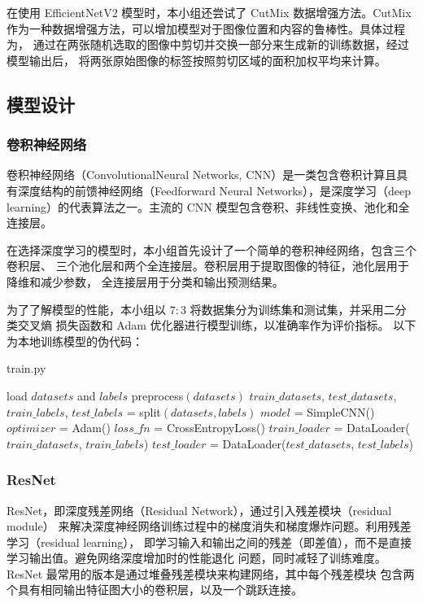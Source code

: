 \documentclass[UTF8,12pt,a4paper]{ctexart}
\begin{document}
在使用 EfficientNetV2 模型时，本小组还尝试了 CutMix 数据增强方法。CutMix 
作为一种数据增强方法，可以增加模型对于图像位置和内容的鲁棒性。具体过程为，
通过在两张随机选取的图像中剪切并交换一部分来生成新的训练数据，经过模型输出后，
将两张原始图像的标签按照剪切区域的面积加权平均来计算。
\subsection{模型设计}
\subsubsection{卷积神经网络}
卷积神经网络（ConvolutionalNeural Networks, CNN）是一类包含卷积计算且具
有深度结构的前馈神经网络（Feedforward Neural Networks），是深度学习（deep
 learning）的代表算法之一。主流的 CNN 模型包含卷积、非线性变换、池化和全连接层。

在选择深度学习的模型时，本小组首先设计了一个简单的卷积神经网络，包含三个卷积层、
三个池化层和两个全连接层。卷积层用于提取图像的特征，池化层用于降维和减少参数，
全连接层用于分类和输出预测结果。

为了了解模型的性能，本小组以 $7: 3$ 将数据集分为训练集和测试集，并采用二分类交叉熵
损失函数和 Adam 优化器进行模型训练，以准确率作为评价指标。
以下为本地训练模型的伪代码：

\begin{algorithm}[H]
	\caption{train.py}
	\BlankLine

	load $datasets$ and $labels$\;
	preprocess$(datasets)$\;
	$train\_datasets$, $test\_datasets$, $train\_labels$, $test\_labels$ = split$(datasets, labels)$\;
	$model$ = SimpleCNN()\;
	$optimizer$ = Adam()\;
	$loss\_fn$ = CrossEntropyLoss()\;
	$train\_loader$ = DataLoader($train\_datasets$, $train\_labels$)\;
	$test\_loader$ = DataLoader($test\_datasets$, $test\_labels$)\;
\end{algorithm}

\subsubsection{ResNet}
ResNet，即深度残差网络（Residual Network），通过引入残差模块（residual module）
来解决深度神经网络训练过程中的梯度消失和梯度爆炸问题。利用残差学习（residual learning），
即学习输入和输出之间的残差（即差值），而不是直接学习输出值。避免网络深度增加时的性能退化
问题，同时减轻了训练难度。ResNet 最常用的版本是通过堆叠残差模块来构建网络，其中每个残差模块
包含两个具有相同输出特征图大小的卷积层，以及一个跳跃连接。
\end{document}
